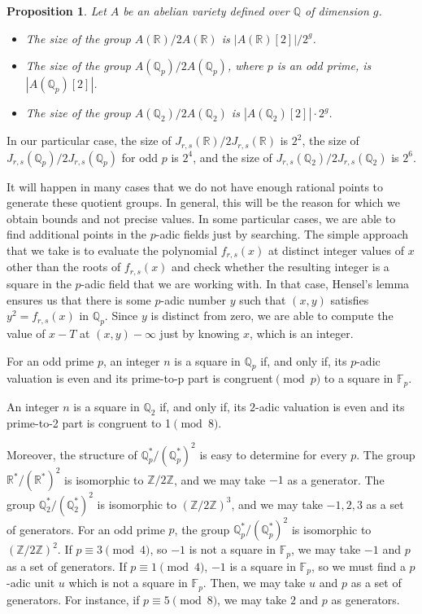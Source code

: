 \documentclass[a4paper, 12pt]{amsart}
\theoremstyle{definition}
\theoremstyle{plain}
\newtheorem{prop0}[defn0]{Proposition}
\theoremstyle{plain}
\theoremstyle{plain}
\theoremstyle{plain}
\theoremstyle{remark}
\theoremstyle{remark}
\theoremstyle{plain}
\newenvironment{proposition}{ \begin{prop0}}{\end{prop0}}
\newcommand{\Q}{\mathbb{Q}}
\newcommand{\Zmod}[1]{\mathbb{Z}/#1\mathbb{Z}}
\newcommand{\GF}[1]{\mathbb{F}_{#1}}
\begin{document}
	\begin{proposition}
		Let $A$ be an abelian variety defined over $\Q$ of dimension $g$.
		\begin{itemize}
			\item[(a)] The size of the group $A(\mathbb{R})/2A(\mathbb{R})$ is $|A(\mathbb{R})[2]|/2^g$.
			\item[(b)] The size of the group $A(\Q_p)/2A(\Q_p)$, where $p$ is an odd prime, is $|A(\Q_p)[2]|$.
			\item[(c)] The size of the group $A(\Q_2)/2A(\Q_2)$ is $|A(\Q_2)[2]|\cdot 2^g$.
		\end{itemize}
	\end{proposition}
	
	In our particular case, the size of $J_{r,s}(\mathbb{R})/2J_{r,s}(\mathbb{R})$ is $2^2$, the size of $J_{r,s}(\Q_p)/2J_{r,s}(\Q_p)$ for odd $p$ is $2^4$, and the size of $J_{r,s}(\Q_2)/2J_{r,s}(\Q_2)$ is $2^6$. 
	
	It will happen in many cases that we do not have enough rational points to generate these quotient groups. In general, this will be the reason for which we obtain bounds and not precise values. In some particular cases, we are able to find additional points in the $p$-adic fields just by searching. The simple approach that we take is to evaluate the polynomial $f_{r,s}(x)$ at distinct integer values of $x$ other than the roots of $f_{r,s}(x)$ and check whether the resulting integer is a square in the $p$-adic field that we are working with. In that case, Hensel's lemma ensures us that there is some $p$-adic number $y$ such that $(x,y)$ satisfies $y^2=f_{r,s}(x)$ in $\Q_p$. Since $y$ is distinct from zero, we are able to compute the value of $x-T$ at $(x,y)-\infty$ just by knowing $x$, which is an integer.
	
	For an odd prime $p$, an integer $n$ is a square in $\Q_p$ if, and only if, its $p$-adic valuation is even and its prime-to-p part is congruent$\pmod p$ to a square in $\mathbb{F}_p$.
	
	An integer $n$ is a square in $\Q_2$ if, and only if, its $2$-adic valuation is even and its prime-to-2 part is congruent to 1$\pmod8$.
	
	Moreover, the structure of $\Q_p^*/(\Q_p^*)^2$ is easy to determine for every $p$. The group $\mathbb{R}^*/(\mathbb{R}^*)^2$ is isomorphic to $\Zmod{2}$, and we may take $-1$ as a generator. The group $\Q_2^*/(\Q_2^*)^2$ is isomorphic to $\left(\Zmod{2}\right)^3$, and we may take $-1,2,3$ as a set of generators. For an odd prime $p$, the group $\Q_p^*/(\Q_p^*)^2$ is isomorphic to $\left(\Zmod{2}\right)^2$. If $p\equiv 3\pmod4$, so $-1$ is not a square in $\GF{p}$, we may take $-1$ and $p$ as a set of generators. If $p\equiv 1\pmod4$, $-1$ is a square in $\GF{p}$, so we must find a $p$-adic unit $u$ which is not a square in $\GF{p}$. Then, we may take $u$ and $p$ as a set of generators. For instance, if $p\equiv 5\pmod8$, we may take $2$ and $p$ as generators.
	
\end{document}

